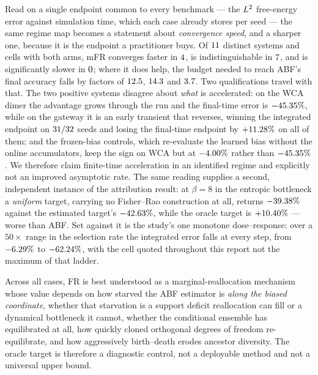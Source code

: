 Read on a single endpoint common to every benchmark --- the $L^2$ free-energy error against
simulation time, which each case already stores per seed --- the same regime map becomes a
statement about \emph{convergence speed}, and a sharper one, because it is the endpoint a
practitioner buys. Of $11$ distinct systems and cells with both arms, mFR converges
faster in $4$, is indistinguishable in $7$, and is significantly slower in
$0$; where it does help, the budget needed to reach ABF's final accuracy falls by
factors of $12.5$, $14.3$ and $3.7$. Two qualifications
travel with that. The two positive systems disagree about \emph{what} is accelerated: on the
WCA dimer the advantage grows through the run and the final-time error is $-45.35\%$,
while on the gateway it is an early transient that reverses, winning the integrated endpoint
on $31/32$ seeds and losing the final-time endpoint by $+11.28\%$ on all of
them; and the frozen-bias controls, which re-evaluate the learned bias without the online
accumulators, keep the sign on WCA but at $-4.00\%$ rather than $-45.35\%$. We
therefore claim finite-time acceleration in an identified regime and explicitly not an improved
asymptotic rate. The same reading supplies a second, independent instance of the
attribution result: at $\beta=8$ in the entropic bottleneck a \emph{uniform} target, carrying
no Fisher--Rao construction at all, returns $-39.38\%$ against the estimated target's
$-42.63\%$, while the oracle target is $+10.40\%$ --- worse than ABF. Set against it is
the study's one monotone dose--response: over a $50\times$ range in the selection rate the
integrated error falls at every step, from $-6.29\%$ to $-62.24\%$, with the cell
quoted throughout this report not the maximum of that ladder.

Across all cases, FR is best understood as a
marginal-reallocation mechanism whose value depends on how starved the ABF estimator is
\emph{along the biased coordinate}, whether that starvation is a support deficit reallocation
can fill or a dynamical bottleneck it cannot, whether the conditional ensemble has equilibrated
at all, how quickly cloned orthogonal degrees of freedom
re-equilibrate, and how aggressively birth--death erodes ancestor diversity. The oracle target is
therefore a diagnostic control, not a deployable method and not a universal upper
bound.
